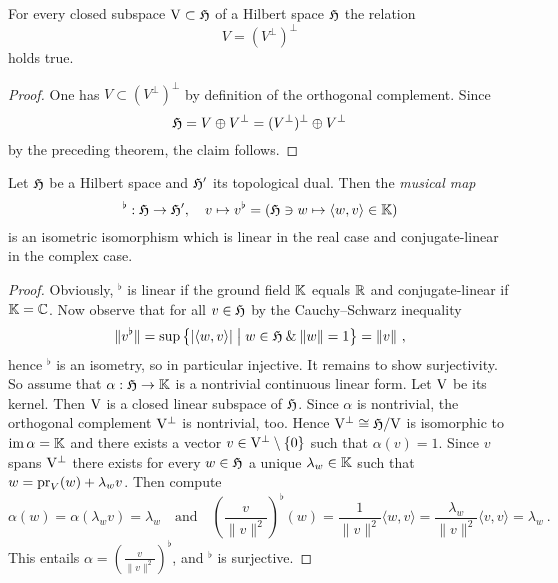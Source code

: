 \begin{corollary}
  For every closed subspace $\mathrm{V} \subset \mathfrak{H}$ of a Hilbert space $\mathfrak{H}$ the relation
  \[
     V = (V^\perp)^\perp 
  \]
  holds true. 
\end{corollary}

\begin{proof}
  One has $V \subset  (V^\perp)^\perp $ by definition of the orthogonal complement. 
  Since \[ \mathfrak{H} = V \oplus  V^\perp =  (V^\perp)^\perp \oplus V^\perp \] 
  by the preceding theorem, the claim follows.
\end{proof}

\begin{theorem}
  Let $\mathfrak{H}$ be a Hilbert space and $\mathfrak{H}'$ its topological dual. Then the \emph{musical map} 
  \[ {}^\flat: \mathfrak{H} \to \mathfrak{H}',\quad 
     v \mapsto v^\flat = \left( \mathfrak{H} \ni w \mapsto \langle w,v\rangle \in \mathbb{K}\right) \]
  is an isometric isomorphism which is linear in the real case and conjugate-linear in the complex case. 
\end{theorem}

\begin{proof}
  Obviously, ${}^\flat$ is linear if the ground field $\mathbb{K}$ equals $\mathbb{R}$ and conjugate-linear if $\mathbb{K}=\mathbb{C}$.
  Now observe that for all $v \in \mathfrak{H}$ by the Cauchy--Schwarz inequality 
  \[
    \| v^\flat \| = \sup\big\{ |\langle w,v \rangle | \bigm\vert w \in \mathfrak{H} \: \& \: \|w\| =1 \big\} = 
    \| v \| \ ,
  \]
  hence ${}^\flat$ is an isometry, so in particular injective. 
  It remains to show surjectivity. So assume that $\alpha : \mathfrak{H} \to \mathbb{K}$ is a nontrivial 
  continuous linear form. 
  Let $\mathrm{V}$ be its kernel. Then  $\mathrm{V}$ is a closed linear subspace of $\mathfrak{H}$.
  Since $\alpha$ is nontrivial, the orthogonal complement $\mathrm{V}^\bot$ is nontrivial, too. Hence 
  $\mathrm{V}^\bot \cong \mathfrak{H}/\mathrm{V}$ is isomorphic to $\operatorname{im} \alpha = \mathbb{K}$ 
  and there exists a  vector $v \in \mathrm{V}^\bot \setminus \{ 0 \} $ such that 
  $\alpha (v) = 1$. Since $v$ spans $ \mathrm{V}^\bot$ there exists   for every $w\in \mathfrak{H}$ a
  unique $\lambda_w  \in \mathbb{K}$ such that $w = \operatorname{pr}_V (w) + \lambda_w v$. Then compute 
  \[
    \alpha (w) = \alpha (\lambda_w v ) = \lambda_w  \quad \text{and} \quad 
    \left( \frac{v}{\|v\|^2}\right)^\flat (w) = 
    \frac{1}{\|v\|^2} \langle w, v \rangle =  \frac{ \lambda_w}{\|v\|^2} \langle v , v \rangle 
    = \lambda_w \ .
  \]
  This entails $\alpha = \left( \frac{v}{\|v\|^2}\right)^\flat$, and ${}^\flat$ is surjective.
\end{proof}

